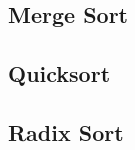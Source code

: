 \documentclass[
../../AuD-Zusammenfassung.tex,
]
{subfiles}
\begin{document}
\newpage
\subsection{Merge Sort}



\newpage
\subsection{Quicksort}



\newpage
\subsection{Radix Sort}


\end{document}
